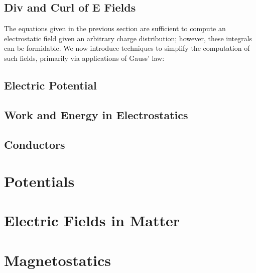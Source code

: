 \subsection{Div and Curl of E Fields}
The equations given in the previous section are sufficient to compute an electrostatic field given an arbitrary charge distribution; however, these integrals can be formidable. We now introduce techniques to simplify the computation of such fields, primarily via applications of Gauss' law:
\subsection{Electric Potential}
\subsection{Work and Energy in Electrostatics}
\subsection{Conductors}


\section{Potentials}


\section{Electric Fields in Matter}
\section{Magnetostatics}
